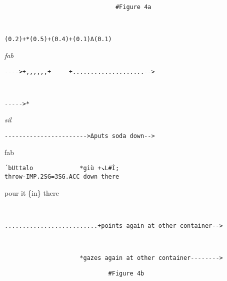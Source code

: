 \documentclass[output=paper,modfonts]{langscibook}
\begin{document}
%
\begin{transbox}{9}{\fig}
\begin{verbatim}
                               #Figure 4a
\end{verbatim}
\end{transbox}
%
\begin{transbox}{10}{~}
\begin{verbatim}
(0.2)+*(0.5)+(0.4)+(0.1)Δ(0.1)
\end{verbatim}
\end{transbox}
%
\begin{transbox}{11}{\textit{fab}}
\begin{verbatim}
---->+,,,,,,+     +....................-->
\end{verbatim}
\end{transbox}
%
\begin{transbox}{12}{~}
\begin{verbatim}
----->*
\end{verbatim}
\end{transbox}\vspace{-0.5mm}
%
\begin{transbox}{13}{\textit{sil}}
\begin{verbatim}
----------------------->Δputs soda down-->
\end{verbatim}
\end{transbox}
%
\begin{mdframednoverticalspace}[style=firstfoc]
\begin{transbox}{14}{fab}
\begin{verbatim}
´bUttalo             *giù +↘L#Ì;
throw-IMP.2SG=3SG.ACC down there
\end{verbatim}
pour it \{in\} there
\end{transbox}
\end{mdframednoverticalspace}\vspace{1mm}
%
\begin{transbox}{15}{~}
\begin{verbatim}
..........................+points again at other container-->
\end{verbatim}
\end{transbox}
%
\begin{transbox}{16}{~}
\begin{verbatim}
                     *gazes again at other container-------->
\end{verbatim}
\end{transbox}
%
\begin{transbox}{17}{\fig}
\begin{verbatim}
                             #Figure 4b
\end{verbatim}
\end{transbox}\vspace{-0.5mm}
\end{document}
